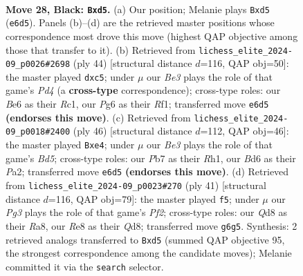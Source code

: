\documentclass[11pt]{article}
\begin{document}
\begin{figure}[p]\centering
\begin{subfigure}{0.46\textwidth}\centering
\resizebox{\linewidth}{!}{%
\newchessgame
\chessboard[
  setfen={r2qr3/ppp3k1/3bbpp1/3P3p/PR6/2N3P1/RPP1QP1P/2B3K1 b - - 0 28},
  showmover=false,
  pgfstyle=straightmove, color=movearrow, markmove={e6-d5}
]}
\caption{}
\end{subfigure}\hfill
\begin{subfigure}{0.46\textwidth}\centering
\resizebox{\linewidth}{!}{%
\newchessgame
\chessboard[
  setfen={r2r2k1/p1q2pp1/1p2p1p1/2pn4/1B1P4/PP2PP2/3Q2PP/2R2RK1 w - - 0 23},
  showmover=false,
  pgfstyle=straightmove, color=movearrow, markmove={d4-c5}
]}
\caption{}
\end{subfigure}
\\[4pt]
\begin{subfigure}{0.46\textwidth}\centering
\resizebox{\linewidth}{!}{%
\newchessgame
\chessboard[
  setfen={2r1r1k1/3n1ppp/pp1P4/2pB1q2/4p3/4PP2/PPQ3PP/1K1R3R w - - 1 24},
  showmover=false,
  pgfstyle=straightmove, color=movearrow, markmove={d5-e4}
]}
\caption{}
\end{subfigure}\hfill
\begin{subfigure}{0.46\textwidth}\centering
\resizebox{\linewidth}{!}{%
\newchessgame
\chessboard[
  setfen={r2q1rk1/p4p2/bp2p1pp/8/3bN3/2P2QP1/PP3PBP/R2R2K1 b - - 0 21},
  showmover=false,
  pgfstyle=straightmove, color=movearrow, markmove={f7-f5}
]}
\caption{}
\end{subfigure}
\caption{\textbf{Move 28, Black: \texttt{Bxd5}.} (a) Our position; Melanie plays \texttt{Bxd5} (\texttt{e6d5}). Panels (b)--(d) are the retrieved master positions whose correspondence most drove this move (highest QAP objective among those that transfer to it). (b) Retrieved from \texttt{lichess\_elite\_2024-09\_p0026\#2698} (ply 44) [structural distance $d$=116, QAP obj=50]: the master played \texttt{dxc5}; under $\mu$ our \emph{Be3} plays the role of that game's \emph{Pd4} (a \textbf{cross-type} correspondence); cross-type roles: our \emph{B}e6 as their \emph{R}c1, our \emph{P}g6 as their \emph{R}f1; transferred move \texttt{e6d5} \textbf{(endorses this move)}. (c) Retrieved from \texttt{lichess\_elite\_2024-09\_p0018\#2400} (ply 46) [structural distance $d$=112, QAP obj=46]: the master played \texttt{Bxe4}; under $\mu$ our \emph{Be3} plays the role of that game's \emph{Bd5}; cross-type roles: our \emph{P}b7 as their \emph{R}h1, our \emph{B}d6 as their \emph{P}a2; transferred move \texttt{e6d5} \textbf{(endorses this move)}. (d) Retrieved from \texttt{lichess\_elite\_2024-09\_p0023\#270} (ply 41) [structural distance $d$=116, QAP obj=79]: the master played \texttt{f5}; under $\mu$ our \emph{Pg3} plays the role of that game's \emph{Pf2}; cross-type roles: our \emph{Q}d8 as their \emph{R}a8, our \emph{R}e8 as their \emph{Q}d8; transferred move \texttt{g6g5}. Synthesis: 2 retrieved analogs transferred to \texttt{Bxd5} (summed QAP objective 95, the strongest correspondence among the candidate moves); Melanie committed it via the \texttt{search} selector.}
\label{fig:thought-m55}
\end{figure}
\end{document}
